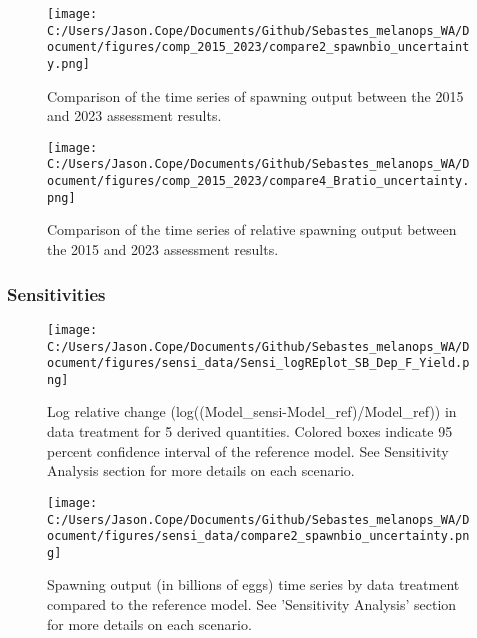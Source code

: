 \documentclass[11pt,
  letterpaper,
]{article}
\begin{document}
\pagebreak

\begin{figure}
{\centering
\texttt{[image: C:/Users/Jason.Cope/Documents/Github/Sebastes\_melanops\_WA/Document/figures/comp\_2015\_2023/compare2\_spawnbio\_uncertainty.png]}
}
\caption{Comparison of the time series of spawning output between the 2015 and 2023 assessment results.\label{fig:comp_ssb}}
\end{figure}

\pagebreak

\begin{figure}
{\centering
\texttt{[image: C:/Users/Jason.Cope/Documents/Github/Sebastes\_melanops\_WA/Document/figures/comp\_2015\_2023/compare4\_Bratio\_uncertainty.png]}
}
\caption{Comparison of the time series of relative spawning output between the 2015 and 2023 assessment results.\label{fig:comp_depl}}
\end{figure}

\pagebreak

\hypertarget{sensitivities}{%
\subsubsection{Sensitivities}\label{sensitivities}}

\begin{figure}
{\centering
\texttt{[image: C:/Users/Jason.Cope/Documents/Github/Sebastes\_melanops\_WA/Document/figures/sensi\_data/Sensi\_logREplot\_SB\_Dep\_F\_Yield.png]}
}
\caption{Log relative change (log((Model\_sensi-Model\_ref)/Model\_ref)) in data treatment for 5 derived quantities. Colored boxes indicate 95 percent confidence interval of the reference model. See Sensitivity Analysis section for more details on each scenario.\label{fig:sensi-data-RE}}
\end{figure}

\pagebreak

\begin{figure}
{\centering
\texttt{[image: C:/Users/Jason.Cope/Documents/Github/Sebastes\_melanops\_WA/Document/figures/sensi\_data/compare2\_spawnbio\_uncertainty.png]}
}
\caption{Spawning output (in billions of eggs) time series by data treatment compared to the reference model. See 'Sensitivity Analysis' section for more details on each scenario.\label{fig:sensi-data-ssb}}
\end{figure}
\end{document}
